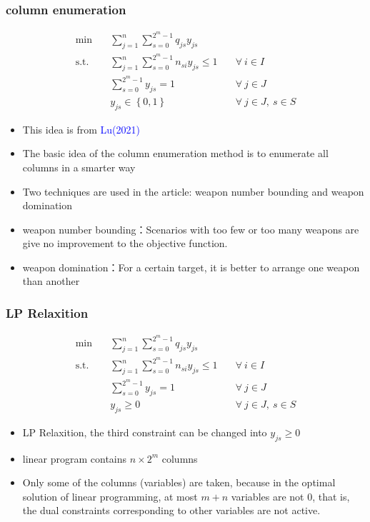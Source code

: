 \documentclass[CJK,10pt]{beamer}
\newcommand{\sumFromTo}[3]{\ensuremath{\sum_{#1}^{#2} #3}}
\newcommand{\optimalProblem}[3]
{\begin{align*}
    #1 \quad &#2 \\
    \mathrm{s. t.}\quad&#3
\end{align*}}
\begin{document}
\begin{frame}
    \frametitle{column enumeration}
    \optimalProblem{\min}{\sumFromTo{j = 1}{n}{\sumFromTo{s = 0}{2^m -1}{q_{js}y_{js}}}\tag{CG}}{\sumFromTo{j = 1}{n}{\sumFromTo{s = 0}{2^m -1}{n_{si}y_{js}}}\leq 1 \quad &\forall ~ i \in I\\& \sumFromTo{s = 0}{2^m - 1}{y_{js}} = 1 \quad &\forall ~ j \in J\\& y_{js} \in \left\{ 0,1 \right\} & \forall ~ j\in J,\ s\in S}

    \begin{itemize}
        \item This idea is from \textcolor{blue}{Lu(2021)}
        \item The basic idea of the column enumeration method is to enumerate all columns in a smarter way
        \item Two techniques are used in the article: weapon number bounding and weapon domination
        \item weapon number bounding：Scenarios with too few or too many weapons are give no improvement to the objective function.
        \item weapon domination：For a certain target, it is better to arrange one weapon than another
    \end{itemize}
\end{frame}




\begin{frame}
    \frametitle{LP Relaxition}
    \optimalProblem{\min}{\sumFromTo{j = 1}{n}{\sumFromTo{s = 0}{2^m -1}{q_{js}y_{js}}}\tag{CG-LP}}{\sumFromTo{j = 1}{n}{\sumFromTo{s = 0}{2^m -1}{n_{si}y_{js}}}\leq 1 \quad &\forall ~ i \in I\\& \sumFromTo{s = 0}{2^m - 1}{y_{js}} = 1 \quad &\forall ~  j \in J\\& y_{js} \geq 0 &\forall ~ j\in J,\ s\in S}
    \begin{itemize}
        \item LP Relaxition, the third constraint can be changed into $y_{js} \geq 0$
        \item linear program contains $n \times 2^m$ columns
        \item Only some of the columns (variables) are taken, because in the optimal solution of linear programming, at most $m+n$ variables are not 0, that is, the dual constraints corresponding to other variables are not active.
    \end{itemize}
\end{frame}
\end{document}
